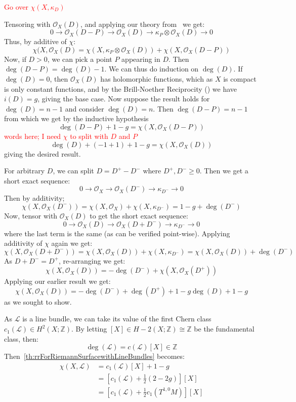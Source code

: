 \documentclass{book}
\newcommand{\Z}{{\mathbb{Z}}}
\newcommand{\CL}{{\mathcal{L}}}
\newcommand{\CO}{{\mathcal{O}}}
\begin{document}
\begin{Proof}
  \textcolor{red}{Go over $\chi(X, \kappa_D)$}

  Tensoring with $\CO_X(D)$, and applying our theory from~\cite[section~4.3]{NateAlgGeo} we get:
  \[
    0 \to \CO_X(D-P) \to \CO_X(D) \to \kappa_P \otimes \CO_X(D) \to 0
  \]
  Thus, by additive of $\chi$:
  \[
    \chi(X, \CO_X(D) = \chi(X, \kappa_P\otimes \CO_X(D)) + \chi(X, \CO_X(D-P))
  \]
  Now, if $D > 0$, we can pick a point $P$ appearing in $D$. Then $\deg(D-P) = \deg(D)-1$. We can thus do
  induction on $\deg(D)$.  If $\deg(D) = 0$, then $\CO_X(D)$ has holomorphic functions, which as $X$ is
  compact is only constant functions, and by the Brill-Noether Reciprocity (\cite{NateComplexAnalysis}) we
  have $i(D) = g$, giving the base case. Now suppose the result holds for $\deg(D) = n-1$ and consider
  $\deg(D) = n$. Then $\deg(D-P) = n-1$ from which we get by the inductive hypothesis
  \[
    \deg(D-P)+1-g = \chi(X, \CO_X(D-P))
  \]
  \textcolor{red}{words here; I need $\chi$ to split with $D$ and $P$}
  \[
    \deg(D)+(-1+1)+1-g = \chi(X, \CO_X(D))
  \]
  giving the desired result.

  For arbitrary $D$, we can split $D = D^+ - D^-$ where $D^+, D^- \ge 0$. Then we get a short exact sequence:
  \[
    0 \to \CO_X \to \CO_X(D^-) \to \kappa_{D^-} \to 0
  \]
  Then by additivity;
  \[
    \chi(X, \CO_X(D^-)) = \chi(X, \CO_X) +\chi(X, \kappa_{D^-}) = 1-g + \deg(D^-)
  \]
  Now, tensor with $\CO_X(D)$ to get the short exact sequence:
  \[
    0 \to \CO_X(D) \to \CO_X(D+D^-) \to \kappa_{D^-} \to 0
  \]
  where the last term is the same (as can be verified point-wise). Applying additivity of $\chi$ again we get:
  \[
    \chi(X, \CO_X(D+D^-)) = \chi(X, \CO_X(D)) + \chi(X, \kappa_{D^-}) = \chi(X, \CO_X(D)) + \deg(D^-)
  \]
  As $D + D^- = D^+$, re-arranging we get:
  \[
     \chi(X, \CO_X(D)) =  - \deg(D^-) + \chi(X, \CO_X(D^+))
  \]
  Applying our earlier result we get:
  \[
     \chi(X, \CO_X(D)) =  - \deg(D^-) + \deg(D^+) + 1-g  \deg(D) + 1-g
  \]
  as we sought to show.
\end{Proof}

As $\CL$ is a line bundle, we can take its value of the first Chern class $c_1(\CL) \in H^2(X; \Z)$. By
letting $[X] \in H-2(X; \Z) \cong \Z$ be the fundamental class, then:
\[
  \deg(\CL) = c(\CL)[X] \in \Z
\]
Then~\cref{th:rrForRiemannSurfacewithLineBundles} becomes:
\begin{align*}
  \chi(X, \CL) &= c_1(\CL)[X] + 1-g\\
               &= \left[c_1(\CL) + \frac{1}{2}(2-2g)\right][X]\\
               &= \left[c_1(\CL) + \frac{1}{2}c_1(T^{1,0}M)\right][X]
\end{align*}
\end{document}
